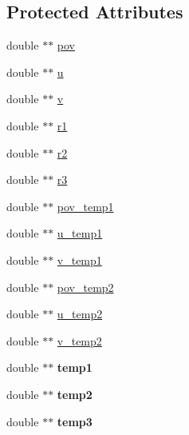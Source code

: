 \subsection*{Protected Attributes}
\begin{DoxyCompactItemize}
\item 
double $\ast$$\ast$ \hyperlink{classAlg_a91da00f3e2a7cef949da58b242d9305e}{pov}
\item 
double $\ast$$\ast$ \hyperlink{classAlg_a2f0a5afa848c3bfb1d8153e62aa434f6}{u}
\item 
double $\ast$$\ast$ \hyperlink{classAlg_a47f1cd35f394c7fafac69953e99274e0}{v}
\item 
double $\ast$$\ast$ \hyperlink{classAlg_ac6058a59828b5bb89532f37d84f4dfc2}{r1}
\item 
double $\ast$$\ast$ \hyperlink{classAlg_a5ca3705a31dd0a0f8e9e3b2455b63f3d}{r2}
\item 
double $\ast$$\ast$ \hyperlink{classAlg_af62c56e11f6523097ab3e1817da8453d}{r3}
\item 
double $\ast$$\ast$ \hyperlink{classAlg_adcdeccfa46eb9907962373371a2adb6b}{pov\_\-temp1}
\item 
double $\ast$$\ast$ \hyperlink{classAlg_ad60a4d85f33f58e39e026e608d8f3aa3}{u\_\-temp1}
\item 
double $\ast$$\ast$ \hyperlink{classAlg_a060c56407375b51f13bdfed2fe0b1e09}{v\_\-temp1}
\item 
double $\ast$$\ast$ \hyperlink{classAlg_aa6628cd62bd2c1e14311dada7d35ed6e}{pov\_\-temp2}
\item 
double $\ast$$\ast$ \hyperlink{classAlg_aa3a0ba123ec36f183c6f878cbc211c7f}{u\_\-temp2}
\item 
double $\ast$$\ast$ \hyperlink{classAlg_a1556924bbf451225dca91c36a7b65071}{v\_\-temp2}
\item 
\hypertarget{classAlg_a72316c58c79fa5494888fcfe4664e9d9}{
double $\ast$$\ast$ {\bfseries temp1}}
\label{classAlg_a72316c58c79fa5494888fcfe4664e9d9}

\item 
\hypertarget{classAlg_a1918cb7d719b4140d5ff445bfb1c97d8}{
double $\ast$$\ast$ {\bfseries temp2}}
\label{classAlg_a1918cb7d719b4140d5ff445bfb1c97d8}

\item 
\hypertarget{classAlg_ab97d547c5f23868d05e29db09e0a6db6}{
double $\ast$$\ast$ {\bfseries temp3}}
\label{classAlg_ab97d547c5f23868d05e29db09e0a6db6}


\end{DoxyCompactItemize}
